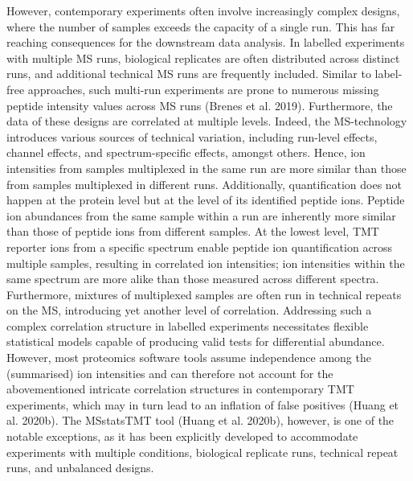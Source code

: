 \documentclass[
  letterpaper,
  DIV=11,
  numbers=noendperiod]{scrartcl}
\begin{document}
However, contemporary experiments often involve increasingly complex
designs, where the number of samples exceeds the capacity of a single
run. This has far reaching consequences for the downstream data
analysis. In labelled experiments with multiple MS runs, biological
replicates are often distributed across distinct runs, and additional
technical MS runs are frequently included. Similar to label-free
approaches, such multi-run experiments are prone to numerous missing
peptide intensity values across MS runs (Brenes et al. 2019).
Furthermore, the data of these designs are correlated at multiple
levels. Indeed, the MS-technology introduces various sources of
technical variation, including run-level effects, channel effects, and
spectrum-specific effects, amongst others. Hence, ion intensities from
samples multiplexed in the same run are more similar than those from
samples multiplexed in different runs. Additionally, quantification does
not happen at the protein level but at the level of its identified
peptide ions. Peptide ion abundances from the same sample within a run
are inherently more similar than those of peptide ions from different
samples. At the lowest level, TMT reporter ions from a specific spectrum
enable peptide ion quantification across multiple samples, resulting in
correlated ion intensities; ion intensities within the same spectrum are
more alike than those measured across different spectra. Furthermore,
mixtures of multiplexed samples are often run in technical repeats on
the MS, introducing yet another level of correlation. Addressing such a
complex correlation structure in labelled experiments necessitates
flexible statistical models capable of producing valid tests for
differential abundance. However, most proteomics software tools assume
independence among the (summarised) ion intensities and can therefore
not account for the abovementioned intricate correlation structures in
contemporary TMT experiments, which may in turn lead to an inflation of
false positives (Huang et al. 2020b). The MSstatsTMT tool (Huang et al.
2020b), however, is one of the notable exceptions, as it has been
explicitly developed to accommodate experiments with multiple
conditions, biological replicate runs, technical repeat runs, and
unbalanced designs.
\end{document}
